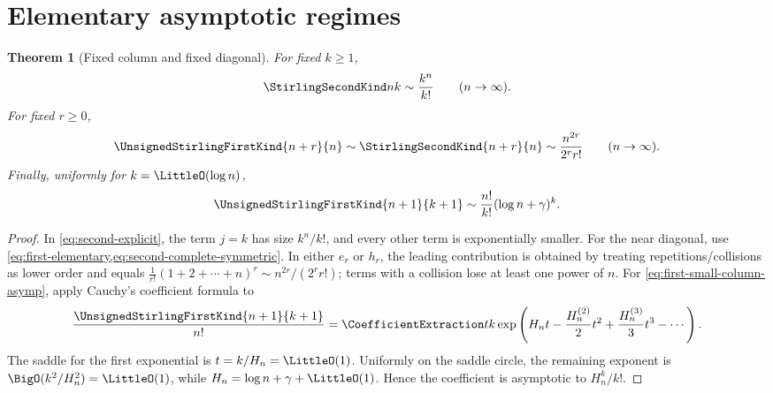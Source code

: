 \documentclass[11pt,a4paper,oneside,openany]{book}
\newtheorem{theorem}{Theorem}[chapter]
\theoremstyle{definition}
\theoremstyle{remark}
\begin{document}
\section{Elementary asymptotic regimes}
\begin{theorem}[Fixed column and fixed diagonal]\label{thm:stirling-simple-asymp}
For fixed $k\ge1$,
\begin{equation}\label{eq:second-fixed-column-asymp}
 \StirlingSecondKind nk\sim\frac{k^n}{k!}\qquad(n\to\infty).
\end{equation}
For fixed $r\ge0$,
\begin{equation}\label{eq:both-near-diagonal-asymp}
 \UnsignedStirlingFirstKind{n+r}{n}\sim\StirlingSecondKind{n+r}{n}
 \sim\frac{n^{2r}}{2^rr!}\qquad(n\to\infty).
\end{equation}
Finally, uniformly for $k=\LittleO(\log n)$,
\begin{equation}\label{eq:first-small-column-asymp}
 \UnsignedStirlingFirstKind{n+1}{k+1}
 \sim\frac{n!}{k!}(\log n+\gamma)^k.
\end{equation}
\end{theorem}
\begin{proof}
In \cref{eq:second-explicit}, the term $j=k$ has size $k^n/k!$, and every other
term is exponentially smaller.  For the near diagonal, use
\cref{eq:first-elementary,eq:second-complete-symmetric}.  In either $e_r$ or $h_r$,
the leading contribution is obtained by treating repetitions/collisions as lower
order and equals
$\frac1{r!}(1+2+\cdots+n)^r\sim n^{2r}/(2^rr!)$; terms with a collision lose at least
one power of $n$.  For \cref{eq:first-small-column-asymp}, apply Cauchy's coefficient
formula to
\[
 \frac{\UnsignedStirlingFirstKind{n+1}{k+1}}{n!}=\CoefficientExtraction tk
 \exp\left(H_nt-\frac{H_n^{(2)}}2t^2+\frac{H_n^{(3)}}3t^3-\cdots\right).
\]
The saddle for the first exponential is $t=k/H_n=\LittleO(1)$.  Uniformly on the saddle
circle, the remaining exponent is $\BigO(k^2/H_n^2)=\LittleO(1)$, while
$H_n=\log n+\gamma+\LittleO(1)$.  Hence the coefficient is asymptotic to $H_n^k/k!$.
\end{proof}
\end{document}
